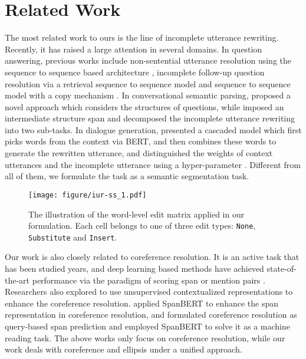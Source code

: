 \documentclass[11pt,a4paper]{article}
\begin{document}
\section{Related Work}

The most related work to ours is the line of incomplete utterance rewriting. Recently, it has raised a large attention in several domains. In question answering, previous works include non-sentential utterance resolution using the sequence to sequence based architecture \cite{kumar-joshi-2016-non}, incomplete follow-up question resolution via a retrieval sequence to sequence model \cite{kumar_2017} and sequence to sequence model with a copy mechanism \cite{elgohary-etal-2019-unpack, quan-etal-2019-gecor}. In conversational semantic parsing, \citet{liu_fanda_2019} proposed a novel approach which considers the structures of questions, while \citet{liu-etal-2019-split} imposed an intermediate structure span and decomposed the incomplete utterance rewriting into two sub-tasks. In dialogue generation, \citet{pan-etal-2019-improving} presented a cascaded model which first picks words from the context via BERT, and then combines these words to generate the rewritten utterance, and \citet{su-etal-2019-improving} distinguished the weights of context utterances and the incomplete utterance using a hyper-parameter . Different from all of them, we formulate the task as a semantic segmentation task.

\begin{figure}[t]
    \centering
    \texttt{[image: figure/iur-ss\_1.pdf]}
    \caption{The illustration of the word-level edit matrix applied in our formulation. Each cell belongs to one of three edit types: {\small\texttt{None}}, {\small\texttt{Substitute}} and {\small\texttt{Insert}}.}
    \label{fig:iur-ss}
\end{figure}

Our work is also closely related to coreference resolution. It is an active task that has been studied years, and deep learning based methods have achieved state-of-the-art performance via the paradigm of scoring span or mention pairs \cite{clark-manning-2015-entity,clark-manning-2016-improving,lee-etal-2017-end,lee-etal-2018-higher}. Researchers also explored to use unsupervised contextualized representations to enhance the coreference resolution. \citet{joshi-etal-2019-bert} applied SpanBERT \cite{mandar_span_bert_2019} to enhance the span representation in coreference resolution, and \citet{wu2019coreference} formulated coreference resolution as query-based span prediction and employed SpanBERT to solve it as a machine reading task.
The above works only focus on coreference resolution, while our work deals with coreference and ellipsis under a unified approach.
\end{document}
